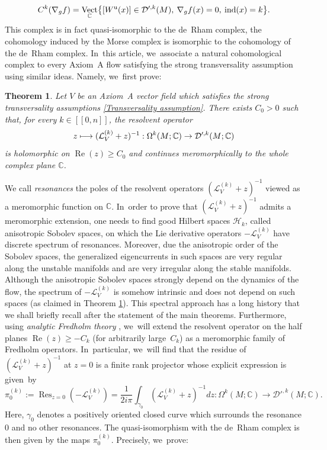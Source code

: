 \documentclass[JEP,XML,SOM,Unicode,NoEqCountersInSection,NoFloatCountersInSection,published]{cedram}
\newcommand\mto{\mathchoice{\longmapsto}{\mapsto}{\mapsto}{\mapsto}}
\newcommand{\lcr}{[\![}
\newcommand{\rcr}{]\!]}
\DeclareMathOperator{\Reel}{Re}
\newcommand{\ru}{\mathrm{u}}
\theoremstyle{definition}
\theoremstyle{plain}
\newtheorem{thm}{Theorem}
\newcommand{\C}{\mathbb{C}}
\newcommand{\D}{\mathcal{D}}
\newcommand{\Hil}{\mathcal{H}}
\newcommand{\Lie}{\mathcal{L}}
\DeclareMathOperator{\ind}{ind}
\DeclareMathOperator{\Res}{Res}
\DeclareMathOperator{\Vect}{Vect}
\begin{document}
\begin{equation}{\label{eq: intro Morse complex current Laudenbach}}
C^k (\nabla_g f) = \Vect_{\C} \bigl\{ [W^\ru (x)] \in \D'^{,k} (M), \: \nabla_g f(x) = 0,\: \ind (x) = k \bigr\}.
\end{equation}
This complex is in fact quasi-isomorphic to the de~Rham complex, \ie the cohomology induced by the Morse complex is isomorphic to the cohomology of the de~Rham complex. In~this article, we~associate a natural cohomological complex to every Axiom~A flow satisfying the strong transversality assumption using similar ideas. Namely, we~first prove:

\begin{thm}\label{thm 2 intro}
Let $V$ be an Axiom~A vector field which satisfies the strong transversality assumptions \eqref{Transversality assumption}. There exists $C_0 > 0$ such that, for every $k\in\lcr0,n\rcr$, the resolvent operator
\[
z \mto(\Lie_V^{(k)} + z)^{-1}: \Omega^k (M;\C) \to \D'^{, k}(M;\C)
\]
is holomorphic on $\Reel (z)\geq C_0$ and continues meromorphically to the whole complex plane $\C$.
\end{thm}

We call \textit{resonances} the poles of the resolvent operators $(\Lie_V^{(k)} + z)^{-1}$ viewed as a meromorphic function on $\C$. In~order to prove that $(\Lie_V^{(k)} + z)^{-1}$ admits a meromorphic extension, one needs to find good Hilbert spaces $\Hil_k$, called anisotropic Sobolev spaces, on which the Lie derivative operators $-\Lie_V^{(k)}$ have discrete spectrum of resonances. Moreover, due the anisotropic order of the Sobolev spaces, the generalized eigencurrents in such spaces are very regular along the unstable manifolds and are very irregular along the stable manifolds. Although the anisotropic Sobolev spaces strongly depend on the dynamics of the flow, the spectrum of $-\Lie_V^{(k)}$ is somehow intrinsic and does not depend on such spaces (as claimed in Theorem \ref{thm 2 intro}). This spectral approach has a long history that we shall briefly recall after the statement of the main theorems. Furthermore, using \textit{analytic Fredholm theory} \cite[App.\,C]{DZ-book}, we~will extend the resolvent operator on the half planes $\Reel (z)\geq -C_k$ (for arbitrarily large~$C_k$) as a meromorphic family of Fredholm operators. In~particular, we~will find that the residue of $(\Lie_V^{(k)} + z)^{-1}$ at $z = 0$ is a finite rank projector whose explicit expression is given~by
\[
\pi_0^{(k)}:= \Res_{z = 0} (- \Lie_V^{(k)}) = \frac{1}{2 i \pi} \int_{\gamma_0} (\Lie_V^{(k)} + z)^{-1} dz: \Omega^k (M;\C) \to \D'^{,k}(M;\C).
\]
Here, $\gamma_0$ denotes a positively oriented closed curve which surrounds the resonance $0$ and no other resonances. The quasi-isomorphism with the de~Rham complex is then given by the maps $\pi_0^{(k)}$. Precisely, we~prove:
\end{document}
